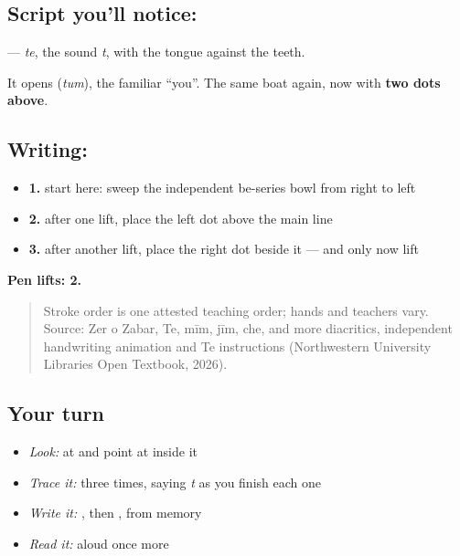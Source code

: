 \subsection*{Script you'll notice: }
\textbf{} — \emph{te}, the sound \emph{t}, with the tongue against the teeth.

It opens \textbf{} (\emph{tum}), the familiar \textquotedblleft{}you\textquotedblright{}. The same boat again, now with \textbf{two dots above}.

\subsection*{Writing: }

\begin{itemize}
\raggedright
  \item \textbf{1.} start here: sweep the independent be-series bowl from right to left
  \item \textbf{2.} after one lift, place the left dot above the main line
  \item \textbf{3.} after another lift, place the right dot beside it — and only now lift
\end{itemize}

\textbf{Pen lifts: 2.}

\begin{quote}
Stroke order is one attested teaching order; hands and teachers vary. Source: Zer o Zabar, Te, mīm, jīm, che, and more diacritics, independent  handwriting animation and Te instructions (Northwestern University Libraries Open Textbook, 2026).
\end{quote}

\subsection*{Your turn}
\begin{itemize}
\raggedright
  \item \emph{Look:} at \textbf{} and point at  inside it
  \item \emph{Trace it:}  three times, saying \emph{t} as you finish each one
  \item \emph{Write it:} , then , from memory
  \item \emph{Read it:} \textbf{} aloud once more
\end{itemize}


